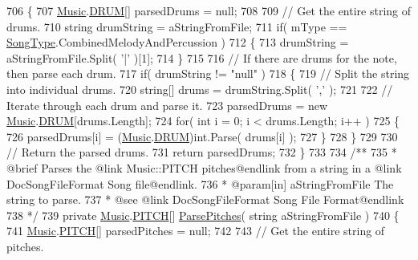 \begin{DoxyCodeInclude}
706     \{
707         \hyperlink{class_music}{Music}.\hyperlink{group___music_enums_gade475b4382c7066d1af13e7c13c029b6}{DRUM}[] parsedDrums = null;
708 
709         \textcolor{comment}{// Get the entire string of drums.}
710         \textcolor{keywordtype}{string} drumString = aStringFromFile;
711         \textcolor{keywordflow}{if}( mType == \hyperlink{group___song_enums_gae681a1f001333e39fc1cb4fea97bfe1b}{SongType}.CombinedMelodyAndPercussion )
712         \{
713             drumString = aStringFromFile.Split( \textcolor{charliteral}{'|'} )[1];
714         \}
715 
716         \textcolor{comment}{// If there are drums for the note, then parse each drum.}
717         \textcolor{keywordflow}{if}( drumString != \textcolor{stringliteral}{"null"} )
718         \{
719             \textcolor{comment}{// Split the string into individual drums.}
720             \textcolor{keywordtype}{string}[] drums = drumString.Split( \textcolor{charliteral}{','} );
721 
722             \textcolor{comment}{// Iterate through each drum and parse it.}
723             parsedDrums = \textcolor{keyword}{new} \hyperlink{class_music}{Music}.\hyperlink{group___music_enums_gade475b4382c7066d1af13e7c13c029b6}{DRUM}[drums.Length];
724             \textcolor{keywordflow}{for}( \textcolor{keywordtype}{int} i = 0; i < drums.Length; i++ )
725             \{
726                 parsedDrums[i] = (\hyperlink{class_music}{Music}.\hyperlink{group___music_enums_gade475b4382c7066d1af13e7c13c029b6}{DRUM})\textcolor{keywordtype}{int}.Parse( drums[i] );
727             \}
728         \}
729 
730         \textcolor{comment}{// Return the parsed drums.}
731         \textcolor{keywordflow}{return} parsedDrums;
732     \}
733 \textcolor{comment}{}
734 \textcolor{comment}{    /** }
735 \textcolor{comment}{     * @brief Parses the @link Music::PITCH pitches@endlink from a string in a @link DocSongFileFormat Song
       file@endlink.}
736 \textcolor{comment}{     * @param[in] aStringFromFile The string to parse.}
737 \textcolor{comment}{     * @see @link DocSongFileFormat Song File Format@endlink}
738 \textcolor{comment}{    */}
739     \textcolor{keyword}{private} \hyperlink{class_music}{Music}.\hyperlink{group___music_enums_ga508f69b199ea518f935486c990edac1d}{PITCH}[] \hyperlink{group___song_priv_func_gacf6fee93921e1a5edbc477c0898c357a}{ParsePitches}( \textcolor{keywordtype}{string} aStringFromFile )
740     \{
741         \hyperlink{class_music}{Music}.\hyperlink{group___music_enums_ga508f69b199ea518f935486c990edac1d}{PITCH}[] parsedPitches = null;
742 
743         \textcolor{comment}{// Get the entire string of pitches.}

\end{DoxyCodeInclude}

